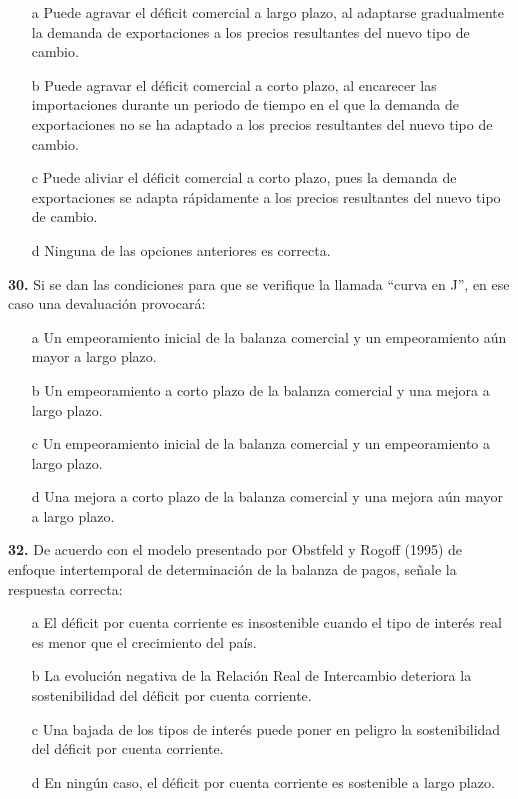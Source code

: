 \documentclass{nuevotema}
\begin{document}
\begin{itemize}
	\item[a] Puede agravar el déficit comercial a largo plazo, al adaptarse gradualmente la demanda de exportaciones a los precios resultantes del nuevo tipo de cambio.
	\item[b] Puede agravar el déficit comercial a corto plazo, al encarecer las importaciones durante un periodo de tiempo en el que la demanda de exportaciones no se ha adaptado a los precios resultantes del nuevo tipo de cambio.
	\item[c] Puede aliviar el déficit comercial a corto plazo, pues la demanda de exportaciones se adapta rápidamente a los precios resultantes del nuevo tipo de cambio.
	\item[d] Ninguna de las opciones anteriores es correcta.
\end{itemize}

\textbf{30.} Si se dan las condiciones para que se verifique la llamada ``curva en J'', en ese caso una devaluación provocará:

\begin{itemize}
	\item[a] Un empeoramiento inicial de la balanza comercial y un empeoramiento aún mayor a largo plazo.
	\item[b] Un empeoramiento a corto plazo de la balanza comercial y una mejora a largo plazo.
	\item[c] Un empeoramiento inicial de la balanza comercial y un empeoramiento a largo plazo.
	\item[d] Una mejora a corto plazo de la balanza comercial y una mejora aún mayor a largo plazo.
\end{itemize}

\textbf{32.} De acuerdo con el modelo presentado por Obstfeld y Rogoff (1995) de enfoque intertemporal de determinación de la balanza de pagos, señale la respuesta correcta:

\begin{itemize}
	\item[a] El déficit por cuenta corriente es insostenible cuando el tipo de interés real es menor que el crecimiento del país.
	\item[b] La evolución negativa de la Relación Real de Intercambio deteriora la sostenibilidad del déficit por cuenta corriente.
	\item[c] Una bajada de los tipos de interés puede poner en peligro la sostenibilidad del déficit por cuenta corriente.
	\item[d] En ningún caso, el déficit por cuenta corriente es sostenible a largo plazo.
\end{itemize}
\end{document}
